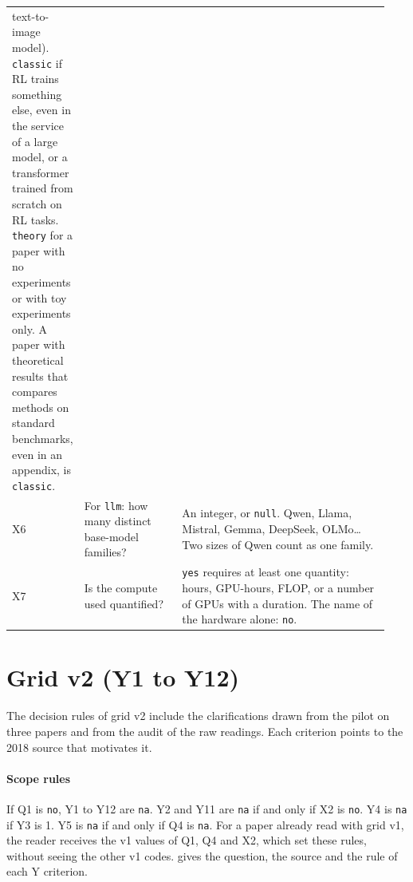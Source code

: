 \begin{small}
\begin{longtable}{@{}p{0.07\linewidth}>{\raggedright\arraybackslash}p{0.27\linewidth}>{\raggedright\arraybackslash}p{0.6\linewidth}@{}}
  text-to-image model). \texttt{classic} if RL trains something else, even in the service of a large
  model, or a transformer trained from scratch on RL tasks. \texttt{theory} for a paper with no
  experiments or with toy experiments only. A paper with theoretical results that compares methods on
  standard benchmarks, even in an appendix, is \texttt{classic}. \\
X6 & For \texttt{llm}: how many distinct base-model families? & An integer, or \texttt{null}. Qwen,
  Llama, Mistral, Gemma, DeepSeek, OLMo\dots{} Two sizes of Qwen count as one family. \\
X7 & Is the compute used quantified? & \texttt{yes} requires at least one quantity: hours, GPU-hours,
  FLOP, or a number of GPUs with a duration. The name of the hardware alone: \texttt{no}. \\
\end{longtable}
\end{small}

\section{Grid v2 (Y1 to Y12)}
\label{sec:a-y}

The decision rules of grid v2 include the clarifications drawn from the pilot on three papers and
from the audit of the raw readings. Each criterion points to the 2018 source that motivates it.

\paragraph{Scope rules} If Q1 is \texttt{no}, Y1 to Y12 are \texttt{na}. Y2 and Y11 are \texttt{na}
if and only if X2 is \texttt{no}. Y4 is \texttt{na} if Y3 is 1. Y5 is \texttt{na} if and only if Q4
is \texttt{na}. For a paper already read with grid v1, the reader receives the v1 values of Q1, Q4
and X2, which set these rules, without seeing the other v1 codes.  gives the
question, the source and the rule of each Y criterion.

